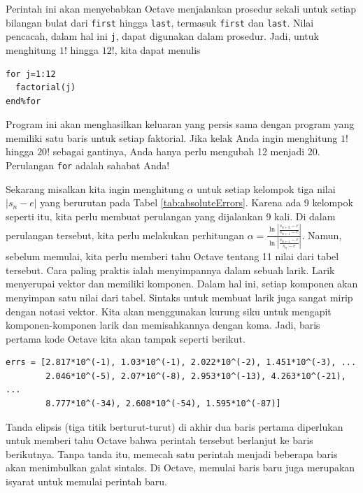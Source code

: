 \noindent Perintah ini akan menyebabkan Octave menjalankan prosedur
sekali untuk setiap bilangan bulat dari \texttt{first} hingga \texttt{last},
termasuk \texttt{first} dan \texttt{last}. Nilai pencacah, dalam hal
ini \texttt{j}, dapat digunakan dalam prosedur. Jadi, untuk menghitung
$1!$ hingga $12!$, kita dapat menulis \begin{verbatim}
for j=1:12
  factorial(j)
end%for
\end{verbatim}

\noindent Program ini akan menghasilkan keluaran yang persis sama
dengan program yang memiliki satu baris untuk setiap faktorial. Jika
kelak Anda ingin menghitung $1!$ hingga $20!$ sebagai gantinya,
Anda hanya perlu mengubah 12 menjadi 20. Perulangan \texttt{for} adalah
sahabat Anda!

Sekarang misalkan kita ingin menghitung $\alpha$ untuk setiap kelompok
tiga nilai $|s_{n}-e|$ yang berurutan pada Tabel \ref{tab:absoluteErrors}.
Karena ada 9 kelompok seperti itu, kita perlu membuat perulangan yang
dijalankan 9 kali. Di dalam perulangan tersebut, kita perlu melakukan
perhitungan ${\displaystyle \alpha=\frac{\ln\left|\frac{s_{n+2}-e}{s_{n+1}-e}\right|}{\ln\left|\frac{s_{n+1}-e}{s_{n}-e}\right|}}$.
Namun, sebelum memulai, kita perlu memberi tahu Octave tentang 11
nilai dari tabel tersebut. Cara paling praktis ialah menyimpannya
dalam sebuah larik. Larik  menyerupai vektor
dan memiliki komponen. Dalam hal ini, setiap komponen akan menyimpan
satu nilai dari tabel. Sintaks untuk membuat larik juga sangat mirip
dengan notasi vektor. Kita akan menggunakan kurung siku untuk mengapit
komponen-komponen larik dan memisahkannya dengan koma. Jadi, baris
pertama kode Octave kita akan tampak seperti berikut. \begin{verbatim}
errs = [2.817*10^(-1), 1.03*10^(-1), 2.022*10^(-2), 1.451*10^(-3), ...
        2.046*10^(-5), 2.07*10^(-8), 2.953*10^(-13), 4.263*10^(-21), ...
        8.777*10^(-34), 2.608*10^(-54), 1.595*10^(-87)]
\end{verbatim}Tanda elipsis (tiga titik berturut-turut) di akhir dua baris pertama
diperlukan untuk memberi tahu Octave bahwa perintah tersebut berlanjut
ke baris berikutnya. Tanpa tanda itu, memecah satu perintah menjadi
beberapa baris akan menimbulkan galat sintaks. Di Octave, memulai
baris baru juga merupakan isyarat untuk memulai perintah baru.


